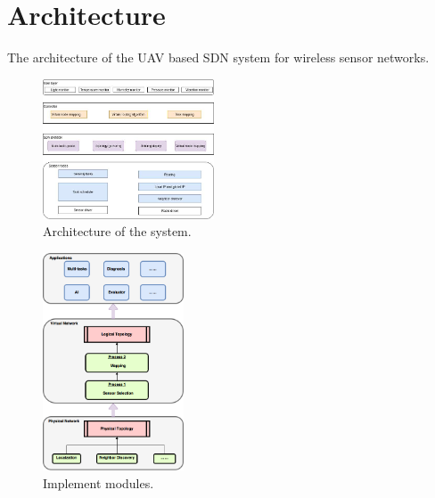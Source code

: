 \section{Architecture}

The architecture of the UAV based SDN system for wireless sensor networks.

\begin{figure}[htbp]
	\centering
	\includegraphics[width=2in]{./Figure/Architecture.jpeg}
	\caption{Architecture of the system.}
	\label{Architecture}
\end{figure}

\begin{figure}[htbp]
	\centering
	\includegraphics[width=1.65in]{./Figure/Design.png}
	\caption{Implement modules.}
	\label{Design}
\end{figure}


